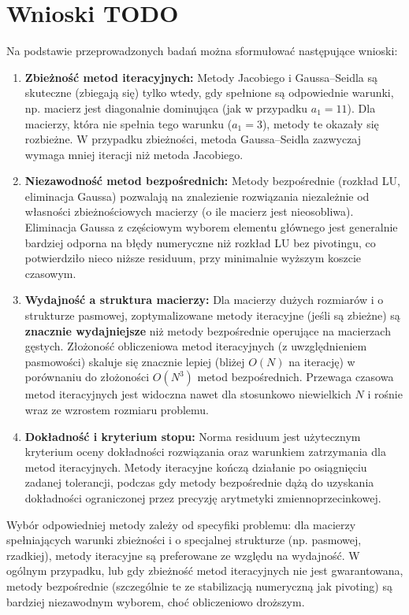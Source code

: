 \documentclass[a4paper, 11pt]{article}
\begin{document}
\section{Wnioski TODO}
Na podstawie przeprowadzonych badań można sformułować następujące wnioski:
\begin{enumerate}
    \item \textbf{Zbieżność metod iteracyjnych:} Metody Jacobiego i Gaussa--Seidla są skuteczne (zbiegają się) tylko wtedy, gdy spełnione są odpowiednie warunki, np. macierz jest diagonalnie dominująca (jak w przypadku $a_1=11$). Dla macierzy, która nie spełnia tego warunku ($a_1=3$), metody te okazały się rozbieżne. W przypadku zbieżności, metoda Gaussa--Seidla zazwyczaj wymaga mniej iteracji niż metoda Jacobiego.
    \item \textbf{Niezawodność metod bezpośrednich:} Metody bezpośrednie (rozkład LU, eliminacja Gaussa) pozwalają na znalezienie rozwiązania niezależnie od własności zbieżnościowych macierzy (o ile macierz jest nieosobliwa). Eliminacja Gaussa z częściowym wyborem elementu głównego jest generalnie bardziej odporna na błędy numeryczne niż rozkład LU bez pivotingu, co potwierdziło nieco niższe residuum, przy minimalnie wyższym koszcie czasowym.
    \item \textbf{Wydajność a struktura macierzy:} Dla macierzy dużych rozmiarów i o strukturze pasmowej, zoptymalizowane metody iteracyjne (jeśli są zbieżne) są \textbf{znacznie wydajniejsze} niż metody bezpośrednie operujące na macierzach gęstych. Złożoność obliczeniowa metod iteracyjnych (z uwzględnieniem pasmowości) skaluje się znacznie lepiej (bliżej $O(N)$ na iterację) w porównaniu do złożoności $O(N^3)$ metod bezpośrednich. Przewaga czasowa metod iteracyjnych jest widoczna nawet dla stosunkowo niewielkich $N$ i rośnie wraz ze wzrostem rozmiaru problemu.
    \item \textbf{Dokładność i kryterium stopu:} Norma residuum jest użytecznym kryterium oceny dokładności rozwiązania oraz warunkiem zatrzymania dla metod iteracyjnych. Metody iteracyjne kończą działanie po osiągnięciu zadanej tolerancji, podczas gdy metody bezpośrednie dążą do uzyskania dokładności ograniczonej przez precyzję arytmetyki zmiennoprzecinkowej.
\end{enumerate}
Wybór odpowiedniej metody zależy od specyfiki problemu: dla macierzy spełniających warunki zbieżności i o specjalnej strukturze (np. pasmowej, rzadkiej), metody iteracyjne są preferowane ze względu na wydajność. W ogólnym przypadku, lub gdy zbieżność metod iteracyjnych nie jest gwarantowana, metody bezpośrednie (szczególnie te ze stabilizacją numeryczną jak pivoting) są bardziej niezawodnym wyborem, choć obliczeniowo droższym.
\end{document}
